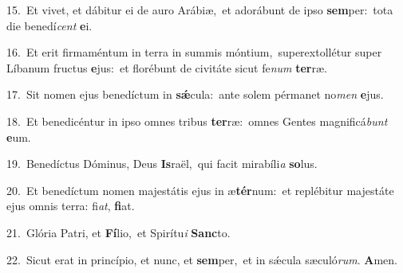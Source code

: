 {\numbfont\textcolor{\numbcolor}{15.}}~Et vivet, et dábitur ei de auro Arábiæ,~\dagger et adorábunt de ipso \textbf{sem}\-per:~\star tota die benedí\textit{cent} \textbf{e}\-i.\par
{\numbfont\textcolor{\numbcolor}{16.}}~Et erit firmaméntum in terra in summis móntium,~\dagger superextollétur super Líbanum fructus \textbf{e}\-jus:~\star et florébunt de civitáte sicut fe\textit{num} \textbf{ter}\-ræ.\par
{\numbfont\textcolor{\numbcolor}{17.}}~Sit nomen ejus benedíctum in \textbf{sǽ}\-cula:~\star ante solem pérmanet no\textit{men} \textbf{e}\-jus.\par
{\numbfont\textcolor{\numbcolor}{18.}}~Et benedicéntur in ipso omnes tribus \textbf{ter}\-ræ:~\star omnes Gentes magnificá\textit{bunt} \textbf{e}\-um.\par
{\numbfont\textcolor{\numbcolor}{19.}}~Benedíctus Dóminus, Deus \textbf{Is}\-raël,~\star qui facit mirabíli\textit{a} \textbf{so}\-lus.\par
{\numbfont\textcolor{\numbcolor}{20.}}~Et benedíctum nomen majestátis ejus in æ\-\textbf{tér}\-num:~\star et replébitur majestáte ejus omnis terra: fi\-\textit{at}\-, \textbf{fi}\-at.\par
{\numbfont\textcolor{\numbcolor}{21.}}~Glória Patri, et \textbf{Fí}\-lio,~\star et Spirítu\textit{i} \textbf{Sanc}\-to.\par
{\numbfont\textcolor{\numbcolor}{22.}}~Sicut erat in princípio, et nunc, et \textbf{sem}\-per,~\star et in sǽcula sæculó\-\textit{rum}\-. \textbf{A}\-men.\par
